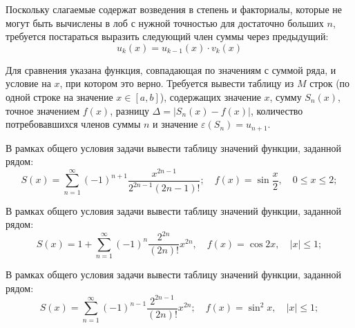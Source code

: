 Поскольку слагаемые содержат возведения в степень и факториалы, которые не
могут быть вычислены в лоб с нужной точностью для достаточно больших $n$,
требуется постараться выразить следующий член суммы через предыдущий:
%
\[
u_k(x) = u_{k-1}(x)\cdot v_k(x)
\]

Для сравнения указана функция, совпадающая по значениям с суммой ряда, и
условие на $x$, при котором это верно. Требуется вывести таблицу из $M$ строк
(по одной строке на значение $x \in [a,b]$), содержащих значение $x$, сумму
$S_n(x)$, точное значением $f(x)$, разницу $\Delta = |S_n(x) - f(x)|$,
количество потребовавшихся членов суммы $n$ и значение
$\varepsilon(S_n)=u_{n+1}$.


\bigskip


\begin{zztask}
В рамках общего условия задачи вывести таблицу значений функции, заданной рядом:
\[ %
	S(x)= \sum_{n=1}^\infty (-1)^{n+1} \frac{x^{2n-1}}{2^{2n-1}(2n-1)!};\quad
	f(x)= \sin \frac{x}{2},
	\quad 0 \leq x \leq 2;
\]
\end{zztask}


\begin{zztask}
В рамках общего условия задачи вывести таблицу значений функции, заданной рядом:
\[ %
  S(x)= 1 + \sum_{n=1}^\infty (-1)^n \frac{2^{2n}}{(2n)!} x^{2n},\quad
  f(x)= \cos 2x,
  \quad |x| \leq 1;
\]
\end{zztask}


\begin{zztask}
В рамках общего условия задачи вывести таблицу значений функции, заданной рядом:
\[ %
  S(x)= \sum_{n=1}^\infty (-1)^{n-1} \frac{2^{2n-1}}{(2n)!} x^{2n};\quad
  f(x)= \sin^2 x,
  \quad |x| \leq 1;
\]
\end{zztask}

